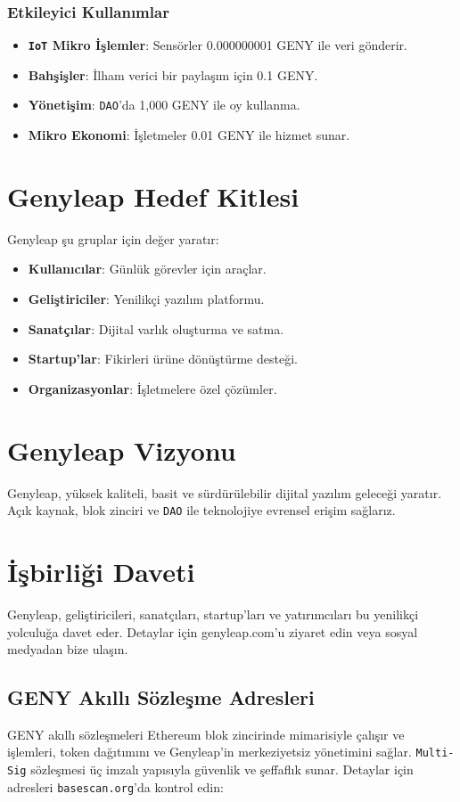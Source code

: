 \documentclass[a4paper,12pt,openany]{book}
\begin{document}
\subsection*{Etkileyici Kullanımlar}
\begin{itemize}
    \item \textbf{\texttt{IoT} Mikro İşlemler}: Sensörler 0.000000001 GENY ile veri gönderir.
    \item \textbf{Bahşişler}: İlham verici bir paylaşım için 0.1 GENY.
    \item \textbf{Yönetişim}: \texttt{DAO}’da 1,000 GENY ile oy kullanma.
    \item \textbf{Mikro Ekonomi}: İşletmeler 0.01 GENY ile hizmet sunar.
\end{itemize}

\chapter{Genyleap Hedef Kitlesi}
Genyleap şu gruplar için değer yaratır:
\begin{itemize}
    \item \textbf{Kullanıcılar}: Günlük görevler için araçlar.
    \item \textbf{Geliştiriciler}: Yenilikçi yazılım platformu.
    \item \textbf{Sanatçılar}: Dijital varlık oluşturma ve satma.
    \item \textbf{Startup’lar}: Fikirleri ürüne dönüştürme desteği.
    \item \textbf{Organizasyonlar}: İşletmelere özel çözümler.
\end{itemize}

\chapter{Genyleap Vizyonu}
Genyleap, yüksek kaliteli, basit ve sürdürülebilir dijital yazılım geleceği yaratır. Açık kaynak, blok zinciri ve \texttt{DAO} ile teknolojiye evrensel erişim sağlarız.

\chapter{İşbirliği Daveti}
Genyleap, geliştiricileri, sanatçıları, startup’ları ve yatırımcıları bu yenilikçi yolculuğa davet eder. Detaylar için genyleap.com’u ziyaret edin veya sosyal medyadan bize ulaşın.

\section*{GENY Akıllı Sözleşme Adresleri}
GENY akıllı sözleşmeleri Ethereum blok zincirinde  mimarisiyle çalışır ve işlemleri, token dağıtımını ve Genyleap’in merkeziyetsiz yönetimini sağlar. \texttt{Multi-Sig} sözleşmesi üç imzalı yapısıyla güvenlik ve şeffaflık sunar. Detaylar için adresleri \texttt{basescan.org}’da kontrol edin:
\end{document}
